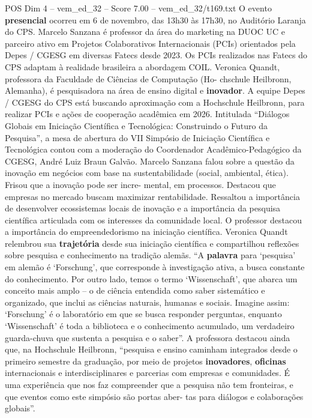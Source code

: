 \begin{textsample}{POS Dim 4 – vem\_ed\_32 – Score 7.00 – vem\_ed\_32/t169.txt}
O evento \textbf{presencial} ocorreu em 6 de novembro, das 13h30 às 17h30, no Auditório Laranja do CPS.
Marcelo Sanzana é professor da área do marketing na DUOC UC e parceiro ativo em Projetos Colaborativos Internacionais (PCIs) orientados pela Depes / CGESG em diversas Fatecs desde 2023.
Os PCIs realizados nas Fatecs do CPS adaptam à realidade brasileira a abordagem COIL.
Veronica Quandt, professora da Faculdade de Ciências de Computação (Ho- chschule Heilbronn, Alemanha), é pesquisadora na área de ensino digital e \textbf{inovador}.
A equipe Depes / CGESG do CPS está buscando aproximação com a Hochschule Heilbronn, para realizar PCIs e ações de cooperação acadêmica em 2026.
Intitulada “Diálogos Globais em Iniciação Científica e Tecnológica: Construindo o Futuro da Pesquisa”, a mesa de abertura do VII Simpósio de Iniciação Científica e Tecnológica contou com a moderação do Coordenador Acadêmico-Pedagógico da CGESG, André Luiz Braun Galvão.
Marcelo Sanzana falou sobre a questão da inovação em negócios com base na sustentabilidade (social, ambiental, ética).
Frisou que a inovação pode ser incre- mental, em processos.
Destacou que empresas no mercado buscam maximizar rentabilidade.
Ressaltou a importância de desenvolver ecossistemas locais de inovação e a importância da pesquisa científica articulada com os interesses da comunidade local.
O professor destacou a importância do empreendedorismo na iniciação científica.
Veronica Quandt relembrou sua \textbf{trajetória} desde sua iniciação científica e compartilhou reflexões sobre pesquisa e conhecimento na tradição alemãs. “A \textbf{palavra} para ‘pesquisa’ em alemão é ‘Forschung’, que corresponde à investigação ativa, a busca constante do conhecimento.
Por outro lado, temos o termo ‘Wissenschaft’, que abarca um conceito mais amplo – o de ciência entendida como saber sistemático e organizado, que inclui as ciências naturais, humanas e sociais.
Imagine assim: ‘Forschung’ é o laboratório em que se busca responder perguntas, enquanto ‘Wissenschaft’ é toda a biblioteca e o conhecimento acumulado, um verdadeiro guarda-chuva que sustenta a pesquisa e o saber”.
A professora destacou ainda que, na Hochschule Heilbronn, “pesquisa e ensino caminham integrados desde o primeiro semestre da graduação, por meio de projetos \textbf{inovadores}, \textbf{oficinas} internacionais e interdisciplinares e parcerias com empresas e comunidades.
É uma experiência que nos faz compreender que a pesquisa não tem fronteiras, e que eventos como este simpósio são portas aber- tas para diálogos e colaborações globais”.

\end{textsample}
